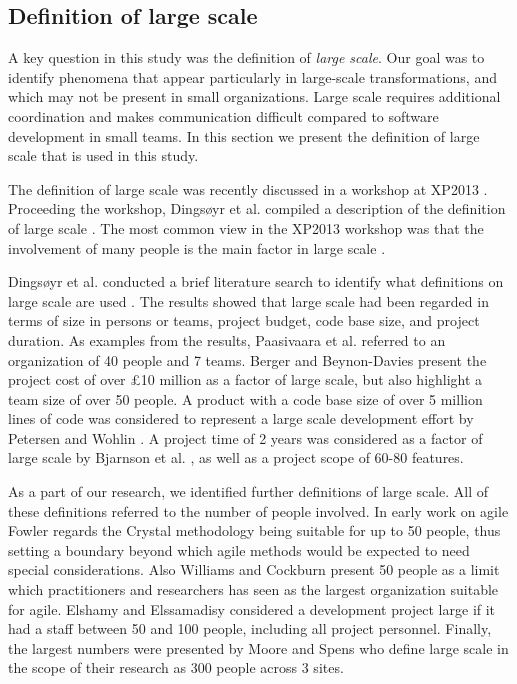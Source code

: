 \subsection{Definition of large scale}
\label{sec:largescale}

A key question in this study was the definition of \emph{large scale}. Our goal
was to identify phenomena that appear particularly in large-scale
transformations, and which may not be present in small organizations. Large
scale requires additional coordination and makes communication difficult
compared to software development in small teams. In this section we present the
definition of large scale that is used in this study.

The definition of large scale was recently discussed in a workshop at XP2013
\cite{Dingsoyr2013a}. Proceeding the workshop, Dingsøyr et al.
compiled a description of the definition of large scale \cite{Dingsoyr2013b}.
The most common view in the XP2013 workshop was that the involvement of many
people is the main factor in large scale \cite{Dingsoyr2013b}.

Dingsøyr et al. conducted a brief literature search to identify what definitions
on large scale are used \cite{Dingsoyr2013b}. The results showed that large
scale had been regarded in terms of size in persons or teams, project budget,
code base size, and project duration. As examples from the results, Paasivaara
et al. \cite{Paasivaara2008} referred to an organization of 40 people and 7
teams. Berger and Beynon-Davies \cite{Berger2009} present the project cost of
over £10 million as a factor of large scale, but also highlight a team size of
over 50 people. A product with a code base size of over 5 million lines of code
was considered to represent a large scale development effort by Petersen and
Wohlin \cite{Petersen2010}. A project time of 2 years was considered as a factor
of large scale by Bjarnson et al. \cite{Bjarnason2011}, as well as a project
scope of 60-80 features.

As a part of our research, we identified further definitions of large scale. All
of these definitions referred to the number of people involved.
In early work on agile Fowler \cite{Fowler2000} regards the Crystal methodology
being suitable for up to 50 people, thus setting a boundary beyond which agile
methods would be expected to need special considerations. Also Williams and
Cockburn \cite{Williams2003} present 50 people as a limit which practitioners
and researchers has seen as the largest organization suitable for agile.
Elshamy and Elssamadisy \cite{Elshamy2006} considered a development project
large if it had a staff between 50 and 100 people, including all project
personnel. Finally, the largest numbers were presented by Moore and Spens
\cite{Moore2008} who define large scale in the scope of their research as 300
people across 3 sites.

